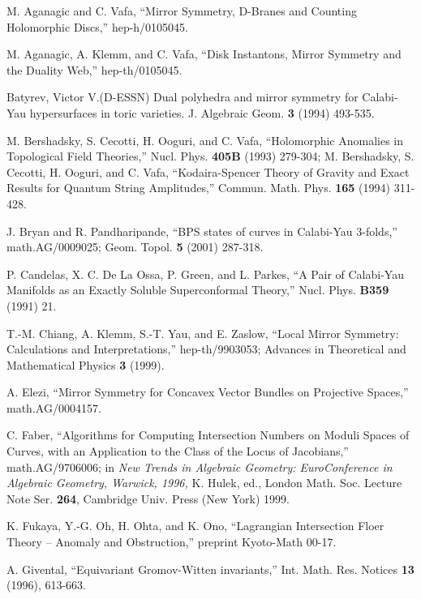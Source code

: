 \documentclass[a4paper,11pt]{article}
\begin{document}
\begin{thebibliography}{99}

 M. Aganagic and C. Vafa,
``Mirror Symmetry, D-Branes and Counting Holomorphic Discs,''
hep-h/0105045.

 M. Aganagic, A. Klemm, and C. Vafa,
``Disk Instantons, Mirror Symmetry and the Duality Web,''
hep-th/0105045.

 Batyrev, Victor V.(D-ESSN) 
Dual polyhedra and mirror symmetry for
Calabi-Yau hypersurfaces in toric varieties.
J. Algebraic Geom. {\bf 3} (1994) 493-535. 

M. Bershadsky, S. Cecotti, H. Ooguri, and C. Vafa,
``Holomorphic Anomalies in Topological Field Theories,''
Nucl. Phys.  {\bf 405B} (1993) 279-304;
M. Bershadsky, S. Cecotti, H. Ooguri, and C. Vafa,
``Kodaira-Spencer Theory of Gravity and Exact
Results for Quantum String Amplitudes,''
Commun. Math. Phys. {\bf 165} (1994) 311-428.

 J. Bryan and R. Pandharipande,
``BPS states of curves in
Calabi-Yau 3-folds,'' math.AG/0009025;
Geom. Topol. {\bf 5} (2001) 287-318.

P. Candelas, X. C. De La Ossa, P. Green, and L. Parkes,
``A Pair of Calabi-Yau Manifolds as an
Exactly Soluble Superconformal
Theory,'' Nucl. Phys. {\bf B359} (1991) 21.

T.-M. Chiang,
A. Klemm, S.-T. Yau, and E. Zaslow, ``Local Mirror
Symmetry:  Calculations and Interpretations,''
hep-th/9903053; Advances in Theoretical and
Mathematical Physics {\bf 3} (1999). 

 A. Elezi,
``Mirror Symmetry for Concavex Vector
Bundles on Projective Spaces,''
math.AG/0004157.

C. Faber,
``Algorithms for Computing Intersection Numbers on
Moduli Spaces of Curves, with an
Application to the Class of the Locus of
Jacobians,'' math.AG/9706006; in
{\em New Trends in Algebraic Geometry:
EuroConference in Algebraic Geometry, Warwick, 1996,}
K. Hulek, ed., 
London Math. Soc. Lecture Note Ser. {\bf 264},
Cambridge Univ. Press (New York) 1999.

 K. Fukaya,
Y.-G. Oh, H. Ohta, and K. Ono,
``Lagrangian Intersection Floer Theory --
Anomaly and Obstruction,''
preprint Kyoto-Math 00-17.

 A. Givental, ``Equivariant Gromov-Witten invariants,''
Int. Math. Res. Notices {\bf 13} (1996), 613-663.


\end{thebibliography}
\end{document}
